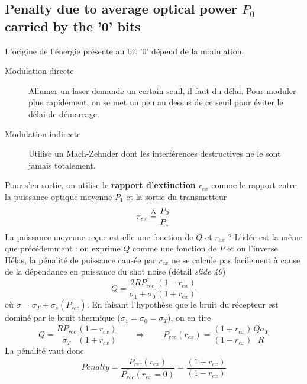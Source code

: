 \subsection{Penalty due to average optical power $P_0$ carried by the '0' bits}
L'origine de l'énergie présente au bit '0' dépend de la modulation. 
\begin{description}
\item[Modulation directe] Allumer un laser demande un certain seuil, il faut du délai. Pour moduler
plus rapidement, on se met un peu au dessus de ce seuil pour éviter le délai de démarrage. 
\item[Modulation indirecte] Utilise un Mach-Zehnder dont les interférences destructives ne le sont
jamais totalement.
\end{description}
Pour s'en sortie, on utilise le \textbf{rapport d'extinction} $r_{ex}$ comme le rapport entre la
puissance optique moyenne $P_1$ et la sortie du transmetteur
\begin{equation}
{r_{ex}} \buildrel \Delta \over = \frac{{{P_0}}}{{{P_1}}}
\end{equation}
La puissance moyenne reçue est-elle une fonction de $Q$ et $r_{ex}$ ? L'idée est la même que 
précédemment : on exprime $Q$ comme une fonction de $P$ et on l'inverse. Hélas, la pénalité de 
puissance causée par $r_{ex}$ ne se calcule pas facilement à cause de la dépendance en puissance du
shot noise (détail \textit{slide 40})
\begin{equation}
Q = \frac{{2R\overline {{P_{rec}}} }}{{{\sigma _1} + {\sigma _0}}}\frac{{\left( {1 - {r_{ex}}} \right)}}{{\left( {1 + {r_{ex}}} \right)}}
\end{equation}
où $\sigma  = {\sigma _T} + {\sigma _s}(\overline {{P_{rec}}} )$. En faisant l'hypothèse que 
le bruit du récepteur est dominé par le bruit thermique (${\sigma _1} = {\sigma _0} = {\sigma _T}$), 
on en tire
\begin{equation}
Q = \frac{{R\overline {{P_{rec}}} }}{{{\sigma _T}}}\frac{{\left( {1 - {r_{ex}}} \right)}}{{\left( {1 + {r_{ex}}} \right)}}\qquad\Rightarrow\qquad \overline {{P_{rec}}} \left( {{r_{ex}}} \right) = \frac{{\left( {1 + {r_{ex}}} \right)}}{{\left( {1 - {r_{ex}}} \right)}}\frac{{Q{\sigma _T}}}{R}
\end{equation}
La pénalité vaut donc
\begin{equation}
Penalty = \frac{{\overline {{P_{rec}}} \left( {{r_{ex}}} \right)}}{{\overline {{P_{rec}}} \left( {{r_{ex}} = 0} \right)}} = \frac{{\left( {1 + {r_{ex}}} \right)}}{{\left( {1 - {r_{ex}}} \right)}}
\end{equation}
\newpage

